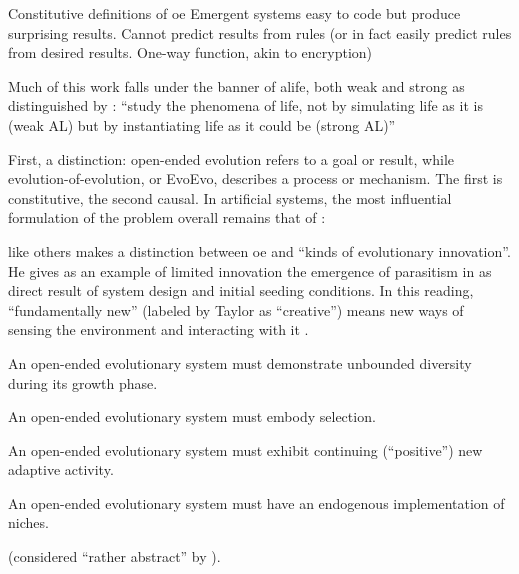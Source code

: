 \begin{DRAFT}

	
Constitutive definitions of \gls{oe}
Emergent systems easy to code but produce surprising results. Cannot predict results from rules (or in fact easily predict rules from desired results. One-way function, akin to encryption) \parencite{Nellis2014}

Much of this work falls under the banner of \gls{alife}, both weak and strong as distinguished by \textcite{Langton1989}: ``study the phenomena of life, not by simulating life as it is (weak AL) but by instantiating life as it could be (strong AL)''

First, a distinction: open-ended evolution refers to a goal or result, while evolution-of-evolution, or EvoEvo, describes a process or mechanism. The first is constitutive, the second causal. In artificial systems, the most influential formulation of the problem overall remains that of \textcite{Bedau:2000mi}:


\parencite{Taylor2001} like others makes a distinction between \gls{oe} and ``kinds of evolutionary innovation''. He gives as an example of limited innovation the emergence of parasitism in \textcite{Ray1991} as direct result of system design and initial seeding conditions. In this reading, ``fundamentally new'' (labeled by Taylor as ``creative'') means new ways of sensing the environment and interacting with it \parencite{Taylor2001}.


\begin{compactitem}
	\item An open-ended evolutionary system must demonstrate unbounded diversity during its growth phase.
	\item An open-ended evolutionary system must embody selection.
	\item An open-ended evolutionary system must exhibit continuing (``positive'') new adaptive activity.
	\item An open-ended evolutionary system must have an endogenous implementation of niches.
\end{compactitem} \textcite{Maley1999} (considered ``rather abstract'' by \textcite[p.341]{Hutton2002}).


\end{DRAFT}

